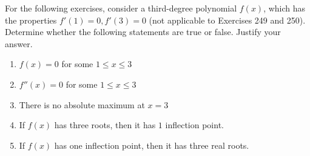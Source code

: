\documentclass{exercises}
\begin{document}
For the following exercises, consider a third-degree polynomial $f(x)$, which has the properties $f'(1)=0,f'(3)=0$ (not applicable to Exercises 249 and 250). Determine whether the following statements are true or false. Justify your answer.

\begin{enumerate}[resume]
\item $f(x)=0$ for some $1\le x\le3$
\item $f''(x)=0$ for some $1\le x\le3$
\item There is no absolute maximum at $x=3$
\item If $f(x)$ has three roots, then it has $1$ inflection point.
\item If $f(x)$ has one inflection point, then it has three real roots.
\end{enumerate}
\end{document}
